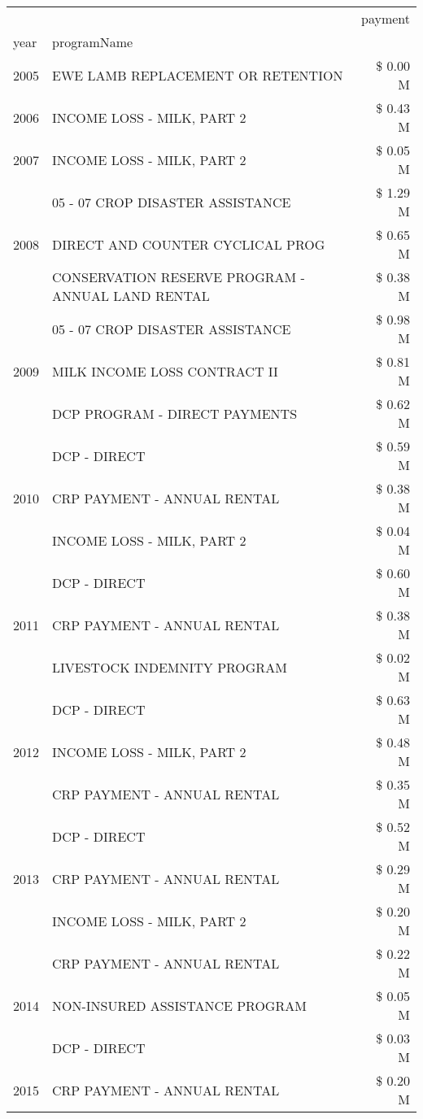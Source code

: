 \begin{tabular}{llr}
\toprule
 &  & payment \\
year & programName &  \\
\midrule
2005 & EWE LAMB REPLACEMENT OR RETENTION & \$ 0.00 M \\
\cline{1-3}
2006 & INCOME LOSS - MILK, PART 2 & \$ 0.43 M \\
\cline{1-3}
2007 & INCOME LOSS - MILK, PART 2 & \$ 0.05 M \\
\cline{1-3}
\multirow[t]{3}{*}{2008} & 05 - 07 CROP DISASTER ASSISTANCE & \$ 1.29 M \\
 & DIRECT AND COUNTER CYCLICAL PROG & \$ 0.65 M \\
 & CONSERVATION RESERVE PROGRAM - ANNUAL LAND RENTAL & \$ 0.38 M \\
\cline{1-3}
\multirow[t]{3}{*}{2009} & 05 - 07 CROP DISASTER ASSISTANCE & \$ 0.98 M \\
 & MILK INCOME LOSS CONTRACT II & \$ 0.81 M \\
 & DCP PROGRAM - DIRECT PAYMENTS & \$ 0.62 M \\
\cline{1-3}
\multirow[t]{3}{*}{2010} & DCP - DIRECT & \$ 0.59 M \\
 & CRP PAYMENT - ANNUAL RENTAL & \$ 0.38 M \\
 & INCOME LOSS - MILK, PART 2 & \$ 0.04 M \\
\cline{1-3}
\multirow[t]{3}{*}{2011} & DCP - DIRECT & \$ 0.60 M \\
 & CRP PAYMENT - ANNUAL RENTAL & \$ 0.38 M \\
 & LIVESTOCK INDEMNITY PROGRAM & \$ 0.02 M \\
\cline{1-3}
\multirow[t]{3}{*}{2012} & DCP - DIRECT & \$ 0.63 M \\
 & INCOME LOSS - MILK, PART 2 & \$ 0.48 M \\
 & CRP PAYMENT - ANNUAL RENTAL & \$ 0.35 M \\
\cline{1-3}
\multirow[t]{3}{*}{2013} & DCP - DIRECT & \$ 0.52 M \\
 & CRP PAYMENT - ANNUAL RENTAL & \$ 0.29 M \\
 & INCOME LOSS - MILK, PART 2 & \$ 0.20 M \\
\cline{1-3}
\multirow[t]{3}{*}{2014} & CRP PAYMENT - ANNUAL RENTAL & \$ 0.22 M \\
 & NON-INSURED ASSISTANCE PROGRAM & \$ 0.05 M \\
 & DCP - DIRECT & \$ 0.03 M \\
\cline{1-3}
\multirow[t]{3}{*}{2015} & CRP PAYMENT - ANNUAL RENTAL & \$ 0.20 M \\

\end{tabular}
